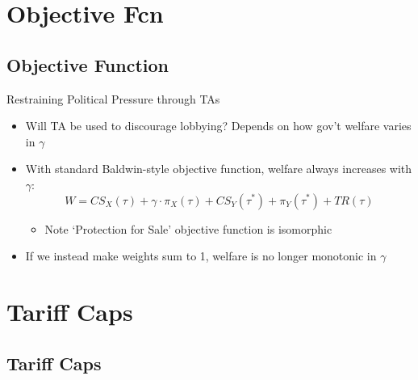 \documentclass[handout]{beamer}
\newcommand{\ga}{\gamma}
\begin{document}


\section{Objective Fcn}
\subsection{Objective Function}
\begin{frame}{Restraining Political Pressure through TAs}
\pause
\begin{itemize}[<+->]
	\item Will TA be used to discourage lobbying? Depends on how gov't welfare varies in $\ga$
	\item With standard Baldwin-style objective function, welfare always increases with $\ga$:
\[
  W = \mathit{CS}_X(\tau) + \ga \cdot \pi_X(\tau) + \mathit{CS}_Y(\tau^*) + \pi_Y(\tau^*) + \mathit{TR}(\tau)
\]
	\begin{itemize}
		\item Note `Protection for Sale' objective function is isomorphic
	\end{itemize}

	\item If we instead make weights sum to 1, welfare is no longer monotonic in $\ga$
\end{itemize}
\end{frame}


\section{Tariff Caps}
\subsection{Tariff Caps}
\end{document}
